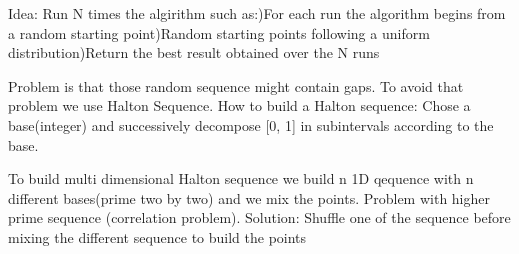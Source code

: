 Idea:\newline
Run  N times the algirithm such as:)For each run the algorithm begins from a random starting
point)Random starting points following a uniform distribution)Return the best result obtained over the N runs\newline

Problem is that those random sequence might contain gaps.\newline
To avoid that problem we use Halton Sequence.\newline
How to build a Halton sequence:\newline
Chose a base(integer) and successively decompose [0, 1] in subintervals according to the base.\newline

To build multi dimensional Halton sequence we build n 1D qequence with n different bases(prime two by two) and we mix the points.\newline
Problem with higher prime sequence (correlation problem).\newline
Solution:\newline
Shuffle one of the sequence before mixing the different sequence to build the points
